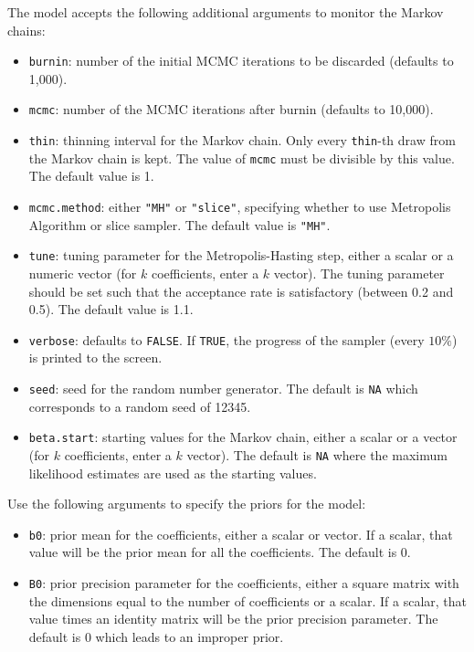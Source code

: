The model accepts the following additional arguments to monitor the
Markov chains:  
\begin{itemize}
\item \texttt{burnin}: number of the initial MCMC iterations to be 
 discarded (defaults to 1,000).

\item \texttt{mcmc}: number of the MCMC iterations after burnin
(defaults to 10,000).

\item \texttt{thin}: thinning interval for the Markov chain. Only every 
 \texttt{thin}-th draw from the Markov chain is kept. The value of 
\texttt{mcmc} must be divisible by this value. The default value is 1.

\item \texttt{mcmc.method}: either {\tt "MH"} or {\tt "slice"}, specifying whether
to use Metropolis Algorithm or slice sampler. The default value is
\texttt{"MH"}.

\item \texttt{tune}: tuning parameter for the Metropolis-Hasting step,
either a scalar or a numeric vector (for $k$ coefficients, enter a $k$
vector).  The tuning parameter should be set such that the acceptance 
rate is satisfactory (between 0.2 and 0.5). The default value is 1.1.

\item \texttt{verbose}: defaults to \texttt{FALSE}.
If \texttt{TRUE}, the progress of the sampler (every $10\%$) is
printed to the screen.

\item \texttt{seed}: seed for the random number generator. The default is 
\texttt{NA} which corresponds to a random seed of 12345. 

\item \texttt{beta.start}: starting values for the Markov 
chain, either a scalar or a vector (for $k$ coefficients, enter a $k$
vector). The default is \texttt{NA} where the maximum likelihood
estimates are used as the starting values.

\end{itemize}

Use the following arguments to specify the priors for the model:  
\begin{itemize}
\item \texttt{b0}: prior mean for the coefficients, either a scalar or
vector.  If a scalar, that value will be the prior mean for all the
coefficients. The default is 0.

\item \texttt{B0}: prior precision parameter for the coefficients,
either a square matrix with the dimensions equal to the number of
coefficients or a scalar. If a scalar, that value times an identity
matrix will be the prior precision parameter. The default is 0 which
leads to an improper prior.
\end{itemize}

